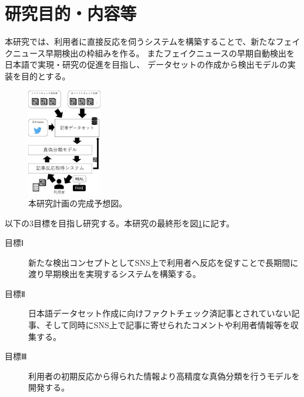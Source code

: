 
\section{研究目的・内容等}

\vspace{20pt}
本研究では、利用者に直接反応を伺うシステムを構築することで、新たなフェイクニュース早期検出の枠組みを作る。
またフェイクニュースの早期自動検出を日本語で実現・研究の促進を目指し、
データセットの作成から検出モデルの実装を目的とする。


\setlength\intextsep{0pt}
\setlength\textfloatsep{0pt}
\begin{figure}
    \vspace{-2\baselineskip}
    \centering
    \includegraphics[width=0.29\textwidth]{figs/final.pdf}
    \vspace{-1cm} 
    \caption{本研究計画の完成予想図。}
    \label{fig:dataset}
    \vspace{-3\baselineskip}
\end{figure}

以下の3目標を目指し研究する。本研究の最終形を図\ref{fig:dataset}に記す。
\begin{description}
    \item[目標Ⅰ] 新たな検出コンセプトとしてSNS上で利用者へ反応を促すことで長期間に渡り早期検出を実現するシステムを構築する。
    \item[目標Ⅱ] 日本語データセット作成に向けファクトチェック済記事とされていない記事、そして同時にSNS上で記事に寄せられたコメントや利用者情報等を収集する。
    \item[目標Ⅲ] 利用者の初期反応から得られた情報より高精度な真偽分類を行うモデルを開発する。
\end{description}

